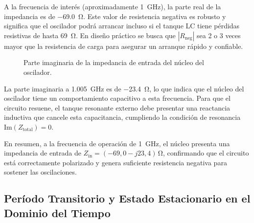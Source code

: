 A la frecuencia de interés (aproximadamente \qty{1}{\GHz}), la parte real de la impedancia es de \qty{-69,0}{\ohm}. Este valor de resistencia negativa es robusto y significa que el oscilador podrá arrancar incluso si el tanque LC tiene pérdidas resistivas de hasta \qty{69}{\ohm}. En diseño práctico se busca que $|R_{\text{neg}}|$ sea 2 o 3 veces mayor que la resistencia de carga para asegurar un arranque rápido y confiable.

\begin{figure}[htbp]
\centering
{}
\caption{Parte imaginaria de la impedancia de entrada del núcleo del oscilador.}
\label{fig:vco_imag_zin}
\end{figure}

La parte imaginaria a \qty{1,005}{\GHz} es de \qty{-23,4}{\ohm}, lo que indica que el núcleo del oscilador tiene un comportamiento capacitivo a esta frecuencia. Para que el circuito resuene, el tanque resonante externo debe presentar una reactancia inductiva que cancele esta capacitancia, cumpliendo la condición de resonancia $\text{Im}(Z_{\text{total}}) = 0$.

En resumen, a la frecuencia de operación de \qty{1}{\GHz}, el núcleo presenta una impedancia de entrada de $Z_{\text{in}} = (-69{,}0 - j23{,}4)\,\unit{\ohm}$, confirmando que el circuito está correctamente polarizado y genera suficiente resistencia negativa para sostener las oscilaciones.

\subsection{Período Transitorio y Estado Estacionario en el Dominio del Tiempo}

